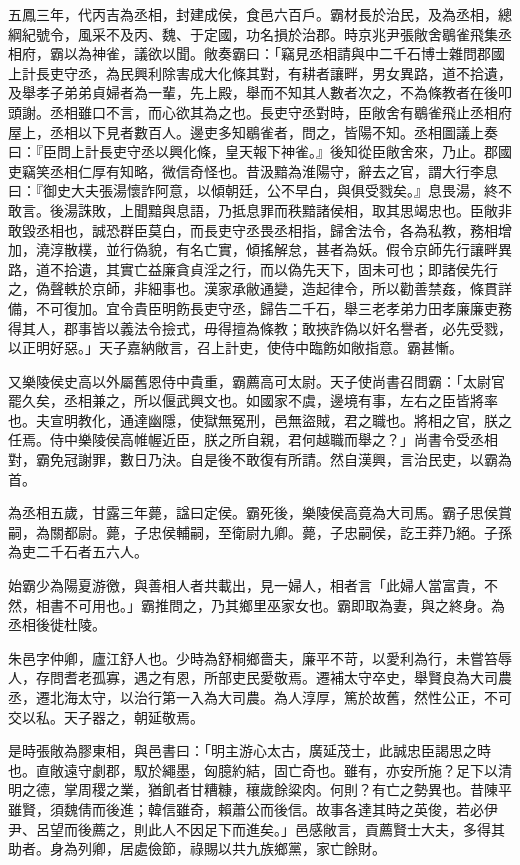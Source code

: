 \begin{pinyinscope}
五鳳三年，代丙吉為丞相，封建成侯，食邑六百戶。霸材長於治民，及為丞相，總綱紀號令，風采不及丙、魏、于定國，功名損於治郡。時京兆尹張敞舍鶡雀飛集丞相府，霸以為神雀，議欲以聞。敞奏霸曰：「竊見丞相請與中二千石博士雜問郡國上計長吏守丞，為民興利除害成大化條其對，有耕者讓畔，男女異路，道不拾遺，及舉孝子弟弟貞婦者為一輩，先上殿，舉而不知其人數者次之，不為條教者在後叩頭謝。丞相雖口不言，而心欲其為之也。長吏守丞對時，臣敞舍有鶡雀飛止丞相府屋上，丞相以下見者數百人。邊吏多知鶡雀者，問之，皆陽不知。丞相圖議上奏曰：『臣問上計長吏守丞以興化條，皇天報下神雀。』後知從臣敞舍來，乃止。郡國吏竊笑丞相仁厚有知略，微信奇怪也。昔汲黯為淮陽守，辭去之官，謂大行李息曰：『御史大夫張湯懷詐阿意，以傾朝廷，公不早白，與俱受戮矣。』息畏湯，終不敢言。後湯誅敗，上聞黯與息語，乃抵息罪而秩黯諸侯相，取其思竭忠也。臣敞非敢毀丞相也，誠恐群臣莫白，而長吏守丞畏丞相指，歸舍法令，各為私教，務相增加，澆淳散樸，並行偽貌，有名亡實，傾搖解怠，甚者為妖。假令京師先行讓畔異路，道不拾遺，其實亡益廉貪貞淫之行，而以偽先天下，固未可也；即諸侯先行之，偽聲軼於京師，非細事也。漢家承敝通變，造起律令，所以勸善禁姦，條貫詳備，不可復加。宜令貴臣明飭長吏守丞，歸告二千石，舉三老孝弟力田孝廉廉吏務得其人，郡事皆以義法令撿式，毋得擅為條教；敢挾詐偽以奸名譽者，必先受戮，以正明好惡。」天子嘉納敞言，召上計吏，使侍中臨飭如敞指意。霸甚慚。

又樂陵侯史高以外屬舊恩侍中貴重，霸薦高可太尉。天子使尚書召問霸：「太尉官罷久矣，丞相兼之，所以偃武興文也。如國家不虞，邊境有事，左右之臣皆將率也。夫宣明教化，通達幽隱，使獄無冤刑，邑無盜賊，君之職也。將相之官，朕之任焉。侍中樂陵侯高帷幄近臣，朕之所自親，君何越職而舉之？」尚書令受丞相對，霸免冠謝罪，數日乃決。自是後不敢復有所請。然自漢興，言治民吏，以霸為首。

為丞相五歲，甘露三年薨，諡曰定侯。霸死後，樂陵侯高竟為大司馬。霸子思侯賞嗣，為關都尉。薨，子忠侯輔嗣，至衛尉九卿。薨，子忠嗣侯，訖王莽乃絕。子孫為吏二千石者五六人。

始霸少為陽夏游徼，與善相人者共載出，見一婦人，相者言「此婦人當富貴，不然，相書不可用也。」霸推問之，乃其鄉里巫家女也。霸即取為妻，與之終身。為丞相後徙杜陵。

朱邑字仲卿，廬江舒人也。少時為舒桐鄉嗇夫，廉平不苛，以愛利為行，未嘗笞辱人，存問耆老孤寡，遇之有恩，所部吏民愛敬焉。遷補太守卒史，舉賢良為大司農丞，遷北海太守，以治行第一入為大司農。為人淳厚，篤於故舊，然性公正，不可交以私。天子器之，朝延敬焉。

是時張敞為膠東相，與邑書曰：「明主游心太古，廣延茂士，此誠忠臣謁思之時也。直敞遠守劇郡，馭於繩墨，匈臆約結，固亡奇也。雖有，亦安所施？足下以清明之德，掌周稷之業，猶飢者甘糟糠，穰歲餘粱肉。何則？有亡之勢異也。昔陳平雖賢，須魏倩而後進；韓信雖奇，賴蕭公而後信。故事各達其時之英俊，若必伊尹、呂望而後薦之，則此人不因足下而進矣。」邑感敞言，貢薦賢士大夫，多得其助者。身為列卿，居處儉節，祿賜以共九族鄉黨，家亡餘財。


\end{pinyinscope}
